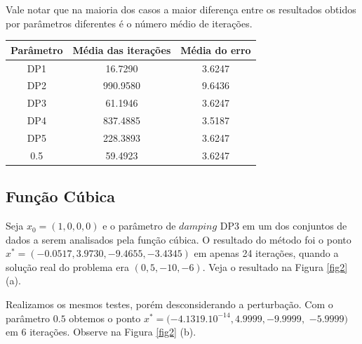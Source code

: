 \documentclass[12pt,a4paper]{article}
\begin{document}
	Vale notar que na maioria dos casos a maior diferença entre os resultados obtidos por parâmetros diferentes é o número médio de iterações.
	
	\begin{table}[H]
		\centering
		\begin{tabular}{|c|c|c|}
			\hline
			Parâmetro & Média das iterações & Média do erro\\
			\hline
			
			DP1 & 16.7290 & 3.6247\\
			\hline
			DP2 & 990.9580 & 9.6436\\ \hline
			DP3 & 61.1946 & 3.6247\\ \hline
			DP4 & 837.4885 & 3.5187\\ \hline
			DP5 & 228.3893 & 3.6247\\ \hline
			0.5 & 59.4923 & 3.6247\\		\hline	
			
		\end{tabular}
	\end{table}
	\subsection{Função Cúbica} \label{cub}
		Seja $x_0 = (1, 0, 0,0)$ e o parâmetro de $damping$ DP3 em um dos conjuntos de dados a serem analisados pela função cúbica. O resultado do método foi o ponto $x^* = (-0.0517, 3.9730, -9.4655, -3.4345)$ em apenas 24 iterações, quando a solução real do problema era $(0,5,-10,-6).$ Veja o resultado na Figura \ref{fig2} (a).
	
	Realizamos os mesmos testes, porém desconsiderando a perturbação. Com o parâmetro $0.5$ obtemos o ponto $x^* = (-4.1319.10^{-14}, 4.9999, -9.9999,$ $ -5.9999)$ em 6 iterações. Observe na Figura \ref{fig2} (b).
	
\end{document}
